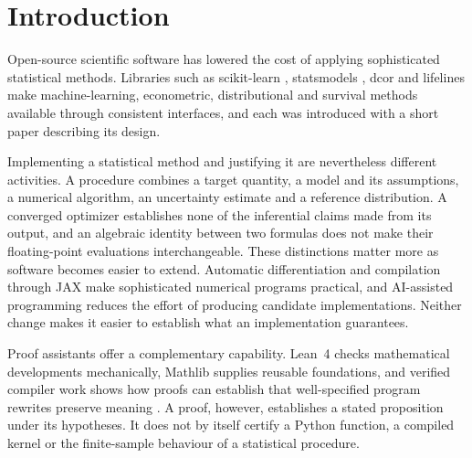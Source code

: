 \section{Introduction}\label{sec:introduction}

Open-source scientific software has lowered the cost of applying sophisticated
statistical methods. Libraries such as scikit-learn
\citep{pedregosa-etal-2011}, statsmodels \citep{seabold-perktold-2010}, dcor
\citep{ramos-carreno-torrecilla-2023} and lifelines \citep{davidson-pilon-2019}
make machine-learning, econometric, distributional and survival methods
available through consistent interfaces, and each was introduced with a short
paper describing its design.

Implementing a statistical method and justifying it are nevertheless different
activities. A procedure combines a target quantity, a model and its
assumptions, a numerical algorithm, an uncertainty estimate and a reference
distribution. A converged optimizer establishes none of the inferential claims
made from its output, and an algebraic identity between two formulas does not
make their floating-point evaluations interchangeable. These distinctions
matter more as software becomes easier to extend. Automatic differentiation and
compilation through JAX \citep{bradbury-etal-2018} make sophisticated numerical
programs practical, and AI-assisted programming reduces the effort of producing
candidate implementations. Neither change makes it easier to establish what an
implementation guarantees.

Proof assistants offer a complementary capability. Lean~4
\citep{de-moura-ullrich-2021} checks mathematical developments mechanically,
Mathlib \citep{mathlib-2020} supplies reusable foundations, and verified
compiler work shows how proofs can establish that well-specified program
rewrites preserve meaning \citep{bhat-etal-2024}. A proof, however, establishes
a stated proposition under its hypotheses. It does not by itself certify a
Python function, a compiled kernel or the finite-sample behaviour of a
statistical procedure.

